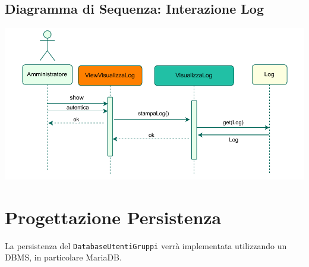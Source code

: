 \subsection*{Diagramma di Sequenza: Interazione Log}
{}
\begin{adjustwidth}{0cm}{0cm}
\includegraphics[scale=1]{progettazione/Diagramma-Sequenza-Interazione-Log.drawio.pdf}
\end{adjustwidth}
\vspace{0.5cm}




\pagebreak
\section*{Progettazione Persistenza}
{}
\vspace{1cm}
La persistenza del \verb|DatabaseUtentiGruppi| verrà implementata utilizzando un DBMS, in particolare MariaDB.
\vspace{0.5cm}
